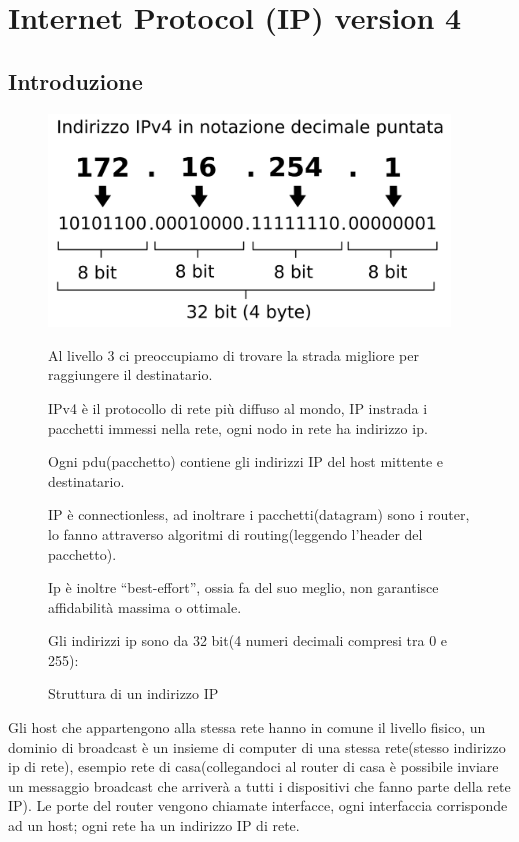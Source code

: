 
\section{Internet Protocol (IP) version 4}

\subsection{Introduzione}
\begin{figure}[h!]
    \begin{minipage}{0.45\textwidth}
        \centering
        \includegraphics[width=0.95\textwidth]{images/indirizzoip.png}
        \caption{Struttura di un indirizzo IP}
        \label{fig:indirizzoip}
    \end{minipage}\hfill
    \begin{minipage}{0.52\textwidth}
        Al livello 3 ci preoccupiamo di trovare la strada migliore per raggiungere il destinatario.

        IPv4 è il protocollo di rete più diffuso al mondo, IP instrada i pacchetti immessi nella rete, ogni nodo in rete ha indirizzo ip.

        Ogni pdu(pacchetto) contiene gli indirizzi IP del host mittente e destinatario.
        
        IP è connectionless, ad inoltrare i pacchetti(datagram) sono i router, lo fanno attraverso algoritmi di routing(leggendo l’header del pacchetto). 

        Ip è inoltre “best-effort”, ossia fa del suo meglio, non garantisce affidabilità massima o ottimale.

        Gli indirizzi ip sono da 32 bit(4 numeri decimali compresi tra 0 e 255):
    \end{minipage}
\end{figure}

Gli host che appartengono alla stessa rete hanno in comune il livello fisico,
un dominio di broadcast è un insieme di computer di una stessa rete(stesso indirizzo ip di rete), esempio rete di casa(collegandoci al router di casa è possibile inviare un messaggio broadcast che arriverà a tutti i dispositivi che fanno parte della rete IP).
Le porte del router vengono chiamate interfacce, ogni interfaccia corrisponde ad un host;
ogni rete ha un indirizzo IP di rete.

